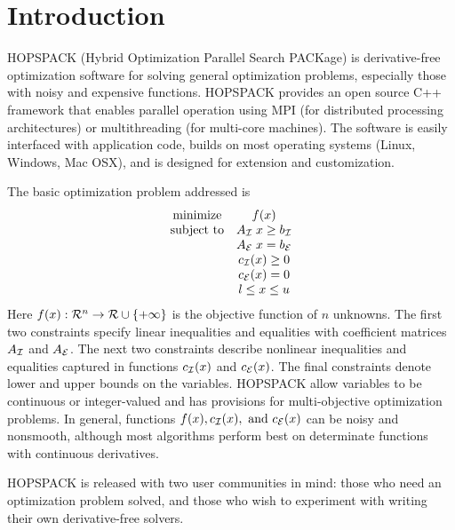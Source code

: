 \section{Introduction}
\label{sec:intro}

HOPSPACK (Hybrid Optimization Parallel Search PACKage) is derivative-free
optimization software for solving general optimization problems, especially
those with noisy and expensive functions.  HOPSPACK provides an open source
C++ framework that enables parallel operation using MPI (for distributed
processing architectures) or multithreading (for multi-core machines).
The software is easily interfaced with application code, builds on most
operating systems (Linux, Windows, Mac OSX), and is designed for extension
and customization.

The basic optimization problem addressed is
\begin{equation}  \label{eq:probdef}
  \begin{array}{cc}
    \mbox{minimize}   &  f(x)  \\
    \mbox{subject to} &  A_{\cal I} \; x \geq b_{\cal I}  \\
                      &  A_{\cal E} \; x = b_{\cal E}  \\
                      &  c_{\cal I}(x) \geq 0  \\
                      &  c_{\cal E}(x) = 0  \\
                      &  l \leq x \leq u
  \end{array}
\end{equation}
Here $f(x): {\cal R}^n \rightarrow {\cal R} \cup \{+ \infty \}$ is the objective
function of $n$ unknowns.
The first two constraints specify linear inequalities and equalities
with coefficient matrices $A_{\cal I}$ and $A_{\cal E}$.
The next two constraints describe nonlinear inequalities and equalities
captured in functions $c_{\cal I}(x)$ and $c_{\cal E}(x)$.
The final constraints denote lower and upper bounds on the variables.
HOPSPACK allow variables to be continuous or integer-valued and has provisions
for multi-objective optimization problems.
In general, functions $f(x), c_{\cal I}(x), \mbox{ and } c_{\cal E}(x)$
can be noisy and nonsmooth, although most algorithms perform best on
determinate functions with continuous derivatives.

HOPSPACK is released with two user communities in mind:  those who need an
optimization problem solved, and those who wish to experiment with writing
their own derivative-free solvers.

